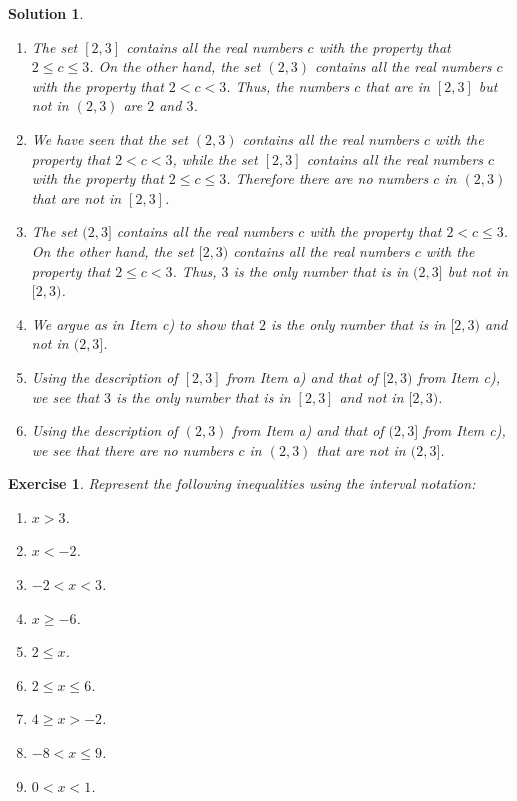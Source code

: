 \documentclass[12pt]{article}
\newtheorem{ex}{Exercise}[section]
\newtheorem{sol}[prop]{Solution}
\begin{document}
\begin{sol}
\begin{enumerate}
\item[a)]The set $[2,3]$ contains all the real numbers $c$ with the property that $2\leq c\leq 3$. On the other hand, the set $(2,3)$ contains all the real numbers $c$ with the property that $2< c< 3$. Thus, the numbers $c$ that are in $[2,3]$ but not in $(2,3)$ are $2$ and $3$.
\item[b)] We have seen that the set $(2,3)$ contains all the real numbers $c$ with the property that $2< c< 3$, while the set $[2,3]$ contains all the real numbers $c$ with the property that $2\leq c\leq 3$. Therefore there are no numbers $c$ in $(2,3)$ that are not in $[2,3]$.
\item[c)] The set $(2,3]$ contains all the real numbers $c$ with the property that $2< c\leq 3$. On the other hand, the set $[2,3)$ contains all the real numbers $c$ with the property that $2\leq c< 3$. Thus, $3$ is the only number that is in $(2,3]$ but not in $[2,3)$.
\item[d)] We argue as in Item c) to show that $2$ is the only number that is in $[2,3)$ and not in $(2,3]$.
\item[e)] Using the description of $[2,3]$ from Item a) and that of $[2,3)$ from Item c), we see that $3$ is the only number that is in $[2,3]$ and not in $[2,3)$. 
\item[f)] Using the description of $(2,3)$ from Item a) and that of $(2,3]$ from Item c), we see that there are no numbers $c$ in $(2,3)$ that are not in $(2,3]$. 
\end{enumerate}
\end{sol}

\begin{ex} Represent the following inequalities using the interval notation:
\begin{multicols}{3}
\begin{enumerate}
\item[a)] $x>3$.
\item[b)] $x<-2$.
\item[c)] $-2<x<3$.
\item[d)]$x\geq -6$.
\item[e)] $2\leq x$.
\item[f)] $2\leq x\leq 6$.
\item[g)] $4\geq x>-2$.
\item[h)] $-8<x\leq 9$.
\item[i)] $0<x<1$.
\end{enumerate}
\end{multicols}
\end{ex}
\end{document}
